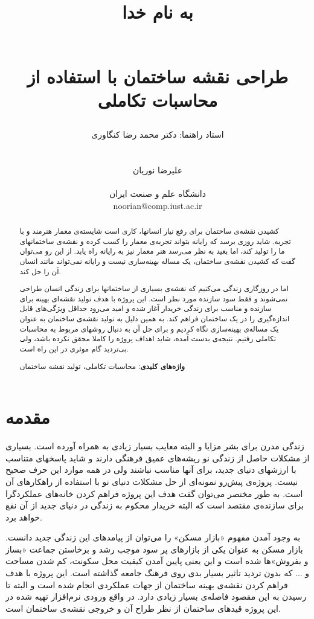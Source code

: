 \documentclass{report}
\title{ 
\begin{normalsize} به نام خدا \end{normalsize}
\\[6cm]
طراحی نقشه ساختمان با استفاده از محاسبات تکاملی
\\[2cm]
}
\author{
استاد راهنما: دکتر محمد رضا کنگاوری
\\
\\
\\
علیرضا نوریان
\\
\\ \small دانشگاه علم و صنعت ایران
\\ \small noorian@comp.iust.ac.ir
}
\begin{document}
\maketitle

\tableofcontents

\begin{abstract}
کشیدن نقشه‌ی ساختمان برای رفع نیاز انسانها، کاری است شایسته‌ی معمار هنرمند و با تجربه. شاید روزی برسد که رایانه بتواند تجربه‌ی معمار را کسب کرده و نقشه‌ی ساختمانهای ما را تولید کند، اما بعید به نظر می‌رسد هنر معمار نیز به رایانه راه یابد. از این رو می‌توان گفت که کشیدن نقشه‌ی ساختمان، یک مساله بهینه‌سازی نیست و رایانه نمی‌تواند مانند انسان آن را حل کند.

اما در روزگاری زندگی می‌کنیم که نقشه‌ی بسیاری از ساختمانها برای زندگی انسان طراحی نمی‌شوند و فقط سود سازنده مورد نظر است. این پروژه با هدف تولید نقشه‌ای بهینه برای سازنده و مناسب برای زندگی خریدار آغاز شده و امید می‌رود حداقل ویژگی‌های قابل اندازه‌گیری را در یک ساختمان فراهم کند. به همین دلیل به تولید نقشه‌ی ساختمان به عنوان یک مساله‌ی بهینه‌سازی نگاه کردیم و برای حل آن به دنبال روشهای مربوط به محاسبات تکاملی رفتیم. نتیجه‌ی بدست آمده، شاید اهداف پروژه را کاملا محقق نکرده باشد، ولی بی‌تردید گام موثری در این راه است. 

\textbf{واژه‌های کلیدی}: محاسبات تکاملی، تولید نقشه ساختمان
\end{abstract}

\section{مقدمه}
زندگی مدرن برای بشر مزایا و البته معایب بسیار زیادی به همراه آورده است. بسیاری از مشکلات حاصل از زندگی نو ریشه‌های عمیق فرهنگی دارند و شاید پاسخهای متناسب با ارزشهای دنیای جدید، برای آنها مناسب نباشند ولی در همه موارد این حرف صحیح نیست. پروژه‌ی پیش‌رو نمونه‌ای از حل مشکلات دنیای نو با استفاده از راهکارهای آن است. به طور مختصر می‌توان گفت هدف این پروژه فراهم کردن خانه‌های عملکردگرا برای سازنده‌ی مقتصد است که البته خریدار محکوم به زندگی در دنیای جدید از آن نفع خواهد برد.

به وجود آمدن مفهوم «بازار مسکن» را می‌توان از پیامدهای این زندگی جدید دانست. بازار مسکن به عنوان یکی از بازارهای پر سود موجب رشد و برخاستن جماعت «بساز و بفروش»ها شده است و این یعنی پایین آمدن کیفیت محل سکونت، کم شدن مساحت و ... که بدون تردید تاثیر بسیار بدی روی فرهنگ جامعه گذاشته است. این پروژه با هدف فراهم کردن نقشه‌ی بهینه ساختمان از جهات عملکردی انجام شده است و البته تا رسیدن به این مقصود فاصله‌ی بسیار زیادی دارد. در واقع ورودی نرم‌افزار تهیه شده در این پروژه قیدهای ساختمان از نظر طراح آن و خروجی نقشه‌ی ساختمان است.
\end{document}
